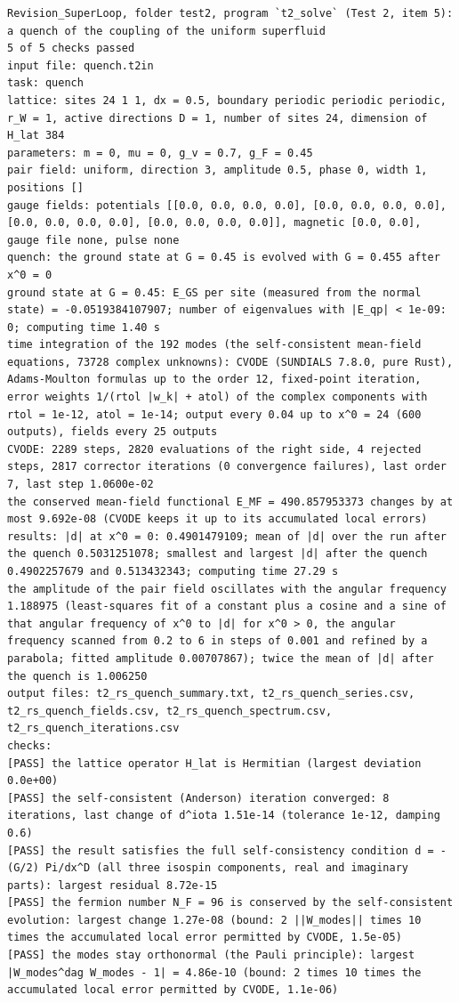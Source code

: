 \documentclass[
  10pt,
]{article}
\begin{document}
\begin{verbatim}
Revision_SuperLoop, folder test2, program `t2_solve` (Test 2, item 5): a quench of the coupling of the uniform superfluid
5 of 5 checks passed
input file: quench.t2in
task: quench
lattice: sites 24 1 1, dx = 0.5, boundary periodic periodic periodic, r_W = 1, active directions D = 1, number of sites 24, dimension of H_lat 384
parameters: m = 0, mu = 0, g_v = 0.7, g_F = 0.45
pair field: uniform, direction 3, amplitude 0.5, phase 0, width 1, positions []
gauge fields: potentials [[0.0, 0.0, 0.0, 0.0], [0.0, 0.0, 0.0, 0.0], [0.0, 0.0, 0.0, 0.0], [0.0, 0.0, 0.0, 0.0]], magnetic [0.0, 0.0], gauge file none, pulse none
quench: the ground state at G = 0.45 is evolved with G = 0.455 after x^0 = 0
ground state at G = 0.45: E_GS per site (measured from the normal state) = -0.0519384107907; number of eigenvalues with |E_qp| < 1e-09: 0; computing time 1.40 s
time integration of the 192 modes (the self-consistent mean-field equations, 73728 complex unknowns): CVODE (SUNDIALS 7.8.0, pure Rust), Adams-Moulton formulas up to the order 12, fixed-point iteration, error weights 1/(rtol |w_k| + atol) of the complex components with rtol = 1e-12, atol = 1e-14; output every 0.04 up to x^0 = 24 (600 outputs), fields every 25 outputs
CVODE: 2289 steps, 2820 evaluations of the right side, 4 rejected steps, 2817 corrector iterations (0 convergence failures), last order 7, last step 1.0600e-02
the conserved mean-field functional E_MF = 490.857953373 changes by at most 9.692e-08 (CVODE keeps it up to its accumulated local errors)
results: |d| at x^0 = 0: 0.4901479109; mean of |d| over the run after the quench 0.5031251078; smallest and largest |d| after the quench 0.4902257679 and 0.513432343; computing time 27.29 s
the amplitude of the pair field oscillates with the angular frequency 1.188975 (least-squares fit of a constant plus a cosine and a sine of that angular frequency of x^0 to |d| for x^0 > 0, the angular frequency scanned from 0.2 to 6 in steps of 0.001 and refined by a parabola; fitted amplitude 0.00707867); twice the mean of |d| after the quench is 1.006250
output files: t2_rs_quench_summary.txt, t2_rs_quench_series.csv, t2_rs_quench_fields.csv, t2_rs_quench_spectrum.csv, t2_rs_quench_iterations.csv
checks:
[PASS] the lattice operator H_lat is Hermitian (largest deviation 0.0e+00)
[PASS] the self-consistent (Anderson) iteration converged: 8 iterations, last change of d^iota 1.51e-14 (tolerance 1e-12, damping 0.6)
[PASS] the result satisfies the full self-consistency condition d = -(G/2) Pi/dx^D (all three isospin components, real and imaginary parts): largest residual 8.72e-15
[PASS] the fermion number N_F = 96 is conserved by the self-consistent evolution: largest change 1.27e-08 (bound: 2 ||W_modes|| times 10 times the accumulated local error permitted by CVODE, 1.5e-05)
[PASS] the modes stay orthonormal (the Pauli principle): largest |W_modes^dag W_modes - 1| = 4.86e-10 (bound: 2 times 10 times the accumulated local error permitted by CVODE, 1.1e-06)
\end{verbatim}
\end{document}
